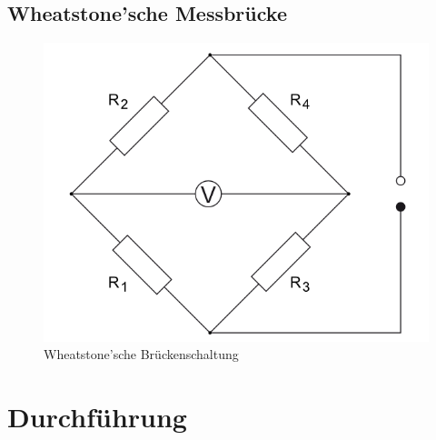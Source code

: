 \documentclass[12pt,a4paper,titlepage,headinclude,bibtotoc]{scrartcl}
\begin{document}
\subsection{Wheatstone'sche Messbrücke}
\begin{figure}[!htb]
	\centering	
	\includegraphics[scale=0.7]{Brueckenschaltung.png}
	\caption{Wheatstone'sche Brückenschaltung \cite{lp}}
\end{figure}


\section{Durchführung}
\label{sec:durchfuehrung}
\end{document}
